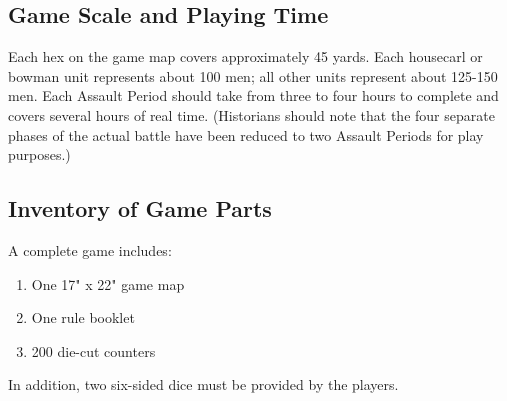 \subsection{Game Scale and Playing Time}

Each hex on the game map covers approximately 45 yards. Each housecarl or bowman unit represents about 100 men; all other units represent about 125-150 men. Each Assault Period should take from three to four hours to complete and covers several hours of real time. (Historians should note that the four separate phases of the actual battle have been reduced to two Assault Periods for play purposes.)

\subsection{Inventory of Game Parts}

A complete game includes:

\begin{enumerate}[label=*]
    \item One 17" x 22" game map
    \item One rule booklet
    \item 200 die-cut counters
\end{enumerate}

In addition, two six-sided dice must be provided by the players.